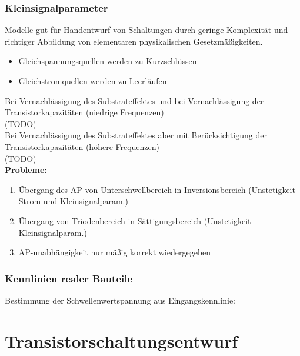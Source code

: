 \documentclass[european]{latex4ei_sheet}
\begin{document}
\begin{sectionbox}
	\subsubsection{Kleinsignalparameter}
	Modelle gut für Handentwurf von Schaltungen durch geringe Komplexität und richtiger Abbildung von elementaren physikalischen Gesetzmäßigkeiten.\\
	\begin{itemize}
		\item Gleichspannungsquellen werden zu Kurzschlüssen
		\item Gleichstromquellen werden zu Leerläufen
	\end{itemize}
	Bei Vernachlässigung des Substrateffektes und bei Vernachlässigung der Transistorkapazitäten (niedrige Frequenzen)\\
	(TODO)\\
	Bei Vernachlässigung des Substrateffektes aber mit Berücksichtigung der Transistorkapazitäten (höhere Frequenzen)\\
	(TODO)\\
	\textbf{Probleme:}
	\begin{enumerate}
		\item Übergang des AP von Unterschwellbereich in Inversionsbereich (Unstetigkeit Strom und Kleinsignalparam.)
		\item Übergang von Triodenbereich in Sättigungsbereich (Unstetigkeit Kleinsignalparam.)
		\item AP-unabhängigkeit nur mäßig korrekt wiedergegeben
	\end{enumerate}
\end{sectionbox}
\begin{sectionbox}
	\subsubsection{Kennlinien realer Bauteile}
	Bestimmung der Schwellenwertspannung aus Eingangskennlinie:\\
\end{sectionbox}

\section{Transistorschaltungsentwurf}
\end{document}
